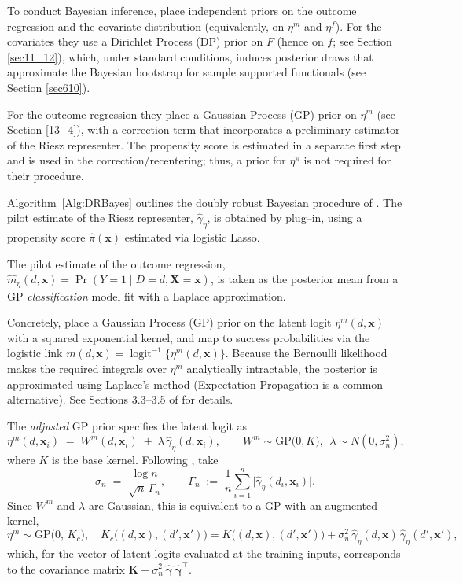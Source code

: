 To conduct Bayesian inference, \cite{breunig2025double} place independent priors on the outcome regression and the covariate distribution (equivalently, on $\eta^m$ and $\eta^f$). For the covariates they use a Dirichlet Process (DP) prior on $F$ (hence on $f$; see Section \ref{sec11_12}), which, under standard conditions, induces posterior draws that approximate the Bayesian bootstrap for sample supported functionals \cite{Lo1987BayesianBootstrap} (see Section \ref{sec610}). 

For the outcome regression they place a Gaussian Process (GP) prior on $\eta^m$ (see Section \ref{13_4}), with a correction term that incorporates a preliminary estimator of the Riesz representer. The propensity score is estimated in a separate first step and is used in the correction/recentering; thus, a prior for $\eta^\pi$ is not required for their procedure.

Algorithm~\ref{Alg:DRBayes} outlines the doubly robust Bayesian procedure of \cite{breunig2025double}. 
The pilot estimate of the Riesz representer, $\hat\gamma_\eta$, is obtained by plug–in, using a propensity score $\hat\pi(\mathbf{x})$ estimated via logistic Lasso.
 
The pilot estimate of the outcome regression, $\hat m_\eta(d,\mathbf{x})=\Pr(Y=1\mid D=d,\mathbf{X}=\mathbf{x})$, is taken as the posterior mean from a GP \emph{classification} model fit with a Laplace approximation.

Concretely, place a Gaussian Process (GP) prior on the latent logit
$\eta^m(d,\mathbf{x})$ with a squared exponential kernel, and map to
success probabilities via the logistic link
$m(d,\mathbf{x})=\operatorname{logit}^{-1}\{\eta^m(d,\mathbf{x})\}$.
Because the Bernoulli likelihood makes the required integrals over
$\eta^m$ analytically intractable, the posterior is approximated using
Laplace’s method (Expectation Propagation is a common alternative).
See Sections 3.3–3.5 of \cite{rasmussen2006gaussian} for details.

The \emph{adjusted} GP prior specifies the latent logit as
\[
\eta^m(d,\mathbf{x}_i)
\;=\;
W^m(d,\mathbf{x}_i)\;+\;\lambda\,\widehat{\gamma}_\eta(d,\mathbf{x}_i),
\qquad
W^m \sim \mathrm{GP}\!\big(0, K\big),\ \ \lambda \sim N(0,\sigma_n^2),
\]
where $K$ is the base kernel. Following \cite{breunig2025double},
take
\[
\sigma_n \;=\; \frac{\log n}{\sqrt{n}\,\Gamma_n},
\qquad
\Gamma_n \;:=\; \frac{1}{n}\sum_{i=1}^n
\big|\widehat{\gamma}_\eta(d_i,\mathbf{x}_i)\big|.
\]
Since $W^m$ and $\lambda$ are Gaussian, this is equivalent to a GP with
an augmented kernel,
\[
\eta^m \sim \mathrm{GP}\!\big(0,\, K_c\big),
\quad
K_c\big((d,\mathbf{x}),(d',\mathbf{x}')\big)
= K\big((d,\mathbf{x}),(d',\mathbf{x}')\big)
+ \sigma_n^2\,\widehat{\gamma}_\eta(d,\mathbf{x})\,
\widehat{\gamma}_\eta(d',\mathbf{x}'),
\]
which, for the vector of latent logits evaluated at the training inputs,
corresponds to the covariance matrix
$\mathbf{K} + \sigma_n^2\,\widehat{\boldsymbol{\gamma}}\,
\widehat{\boldsymbol{\gamma}}^{\top}$. 

